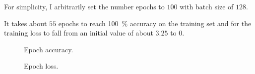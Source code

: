 \documentclass[a4paper]{exam}
\begin{document}
\begin{questions}
    For simplicity, I arbitrarily set the number epochs to $100$ with batch size of $128$.

    It takes about $55$ epochs to reach \qty{100}{\percent} accuracy on the training set and for the training loss to fall from an initial value of about $3.25$ to $0$.

    \begin{figure}[hb]
        \centering
        
        \caption{Epoch accuracy.}
        \label{fig:epoch_accuracy}
    \end{figure}

    \begin{figure}[htb]
        \centering
        
        \caption{Epoch loss.}
        \label{fig:epoch_loss}
    \end{figure}
\end{questions}
\clearpage


\end{document}
